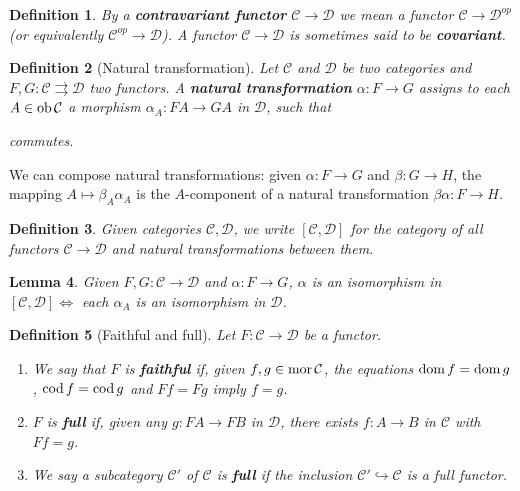 \documentclass[a4paper]{article}
\newtheorem{definition}{Definition}
\newtheorem{lemma}[definition]{Lemma}
\numberwithin{definition}{section}
\newcommand*\dom[1]{\textnormal{dom}\,#1}
\newcommand*\cod[1]{\textnormal{cod}\,#1}
\newcommand*\ob[1]{\textnormal{ob}\,#1}
\newcommand*\mor[1]{\textnormal{mor}\,#1}
\begin{document}
\begin{definition}
	By a \textbf{contravariant functor} $\mathcal{C} \to \mathcal{D}$ we mean a functor $\mathcal{C} \to \mathcal{D}^{op}$ (or equivalently $\mathcal{C}^{op} \to \mathcal{D}$). A functor $\mathcal{C} \to \mathcal{D}$ is sometimes said to be \textbf{covariant}.
\end{definition}

\begin{definition}[Natural transformation]
	Let $\mathcal{C}$ and $\mathcal{D}$ be two categories and $F, G: \mathcal{C} \rightrightarrows \mathcal{D}$ two functors. A \textbf{natural transformation} $\alpha:F\to G$ assigns to each $A \in \ob{\mathcal{C}}$ a morphism $\alpha_A:FA\to GA$ in $\mathcal{D}$, such that
	\begin{center}
	\end{center}
	commutes.
\end{definition}

We can compose natural transformations: given $\alpha: F \to G$ and $\beta: G \to H$, the mapping $A \mapsto \beta_A \alpha_A$ is the $A$-component of a natural transformation $\beta\alpha: F \to H$.

\begin{definition}
	Given categories $\mathcal{C}, \mathcal{D}$, we write $[\mathcal{C},\mathcal{D}]$ for the category of all functors $\mathcal{C} \to \mathcal{D}$ and natural transformations between them.
\end{definition}

\begin{lemma}
	Given $F,G: \mathcal{C} \to \mathcal{D}$ and $\alpha: F \to G$, $\alpha$ is an isomorphism in $[\mathcal{C}, \mathcal{D}] \iff$ each $\alpha_A$ is an isomorphism in $\mathcal{D}$.
\end{lemma}

\begin{definition}[Faithful and full]
	Let $F: \mathcal{C} \to \mathcal{D}$ be a functor.
	\begin{enumerate}[label=\alph*.]
		\item We say that $F$ is \textbf{faithful} if, given $f, g \in \mor{\mathcal{C}}$, the equations $\dom{f}=\dom{g}$, $\cod{f}=\cod{g}$ and $Ff = Fg$ imply $f=g$.
		\item $F$ is \textbf{full} if, given any $g: FA \to FB$ in $\mathcal{D}$, there exists $f: A \to B$ in $\mathcal{C}$ with $Ff =g$.
		\item We say a subcategory $\mathcal{C}'$ of $\mathcal{C}$ is \textbf{full} if the inclusion $\mathcal{C}' \hookrightarrow \mathcal{C}$ is a full functor.
	\end{enumerate}
\end{definition}
\end{document}
